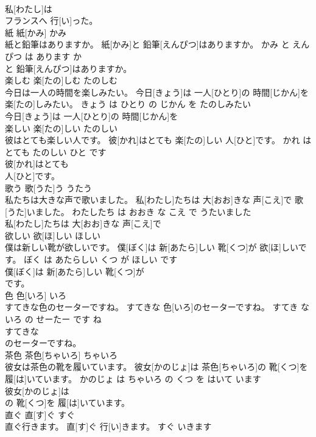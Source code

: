 \documentclass[8pt]{extreport}
\begin{document}
\begin{CJK}{UTF8}{min}
\\	私[わたし]は
\\	フランスへ 行[い]った。			
\\	紙	紙[かみ]	かみ	
\\	紙と鉛筆はありますか。	紙[かみ]と 鉛筆[えんぴつ]はありますか。	かみ と えんぴつ は あります か	
\\	と 鉛筆[えんぴつ]はありますか。			
\\	楽しむ	楽[たの]しむ	たのしむ	
\\	今日は一人の時間を楽しみたい。	今日[きょう]は 一人[ひとり]の 時間[じかん]を 楽[たの]しみたい。	きょう は ひとり の じかん を たのしみたい	
\\	今日[きょう]は 一人[ひとり]の 時間[じかん]を
\\	楽しい	楽[たの]しい	たのしい	
\\	彼はとても楽しい人です。	彼[かれ]はとても 楽[たの]しい 人[ひと]です。	かれ は とても たのしい ひと です	
\\	彼[かれ]はとても
\\	人[ひと]です。			
\\	歌う	歌[うた]う	うたう	
\\	私たちは大きな声で歌いました。	私[わたし]たちは 大[おお]きな 声[こえ]で 歌[うた]いました。	わたしたち は おおき な こえ で うたいました	
\\	私[わたし]たちは 大[おお]きな 声[こえ]で
\\	欲しい	欲[ほ]しい	ほしい	
\\	僕は新しい靴が欲しいです。	僕[ぼく]は 新[あたら]しい 靴[くつ]が 欲[ほ]しいです。	ぼく は あたらしい くつ が ほしい です	
\\	僕[ぼく]は 新[あたら]しい 靴[くつ]が
\\	です。			
\\	色	色[いろ]	いろ	
\\	すてきな色のセーターですね。	すてきな 色[いろ]のセーターですね。	すてき な いろ の せーたー です ね	
\\	すてきな
\\	のセーターですね。			
\\	茶色	茶色[ちゃいろ]	ちゃいろ	
\\	彼女は茶色の靴を履いています。	彼女[かのじょ]は 茶色[ちゃいろ]の 靴[くつ]を 履[は]いています。	かのじょ は ちゃいろ の くつ を はいて います	
\\	彼女[かのじょ]は
\\	の 靴[くつ]を 履[は]いています。			
\\	直ぐ	直[す]ぐ	すぐ	
\\	直ぐ行きます。	直[す]ぐ 行[い]きます。	すぐ いきます	

\end{CJK}
\end{document}
